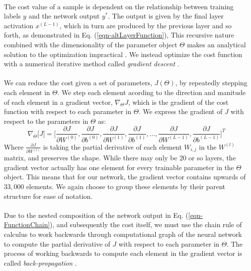 \documentclass[12pt,letterpaper]{article}
\begin{document}
\paragraph*{}The cost value of a sample is dependent on the relationship between training labels $y$ and the network output $y^*$. The output is given by the final layer activation $x^{(L-1)}$, which in turn are produced by the previous layer and so forth, as demonstrated in Eq. (\ref{eqn-altLayerFunction}), This recursive nature combined with the dimensionality of the parameter object $\Theta$ makes an analytical solution to the optimization impractical \cite{Geron,Goodfellow,James}. We instead optimize the cost function with a numerical iterative method called \textit{gradient descent} \cite{Loy}. 

\paragraph*{}We can reduce the cost given a set of parameters, $J(\Theta)$, by repeatedly stepping each element in $\Theta$. We step each element acording to the direction and manitude of each element in a gradient vector, $\nabla_\Theta J$, which is the gradient of the cost function with respect to each parameter in $\Theta$. We express the gradient of $J$ with respect to the parameters in $\Theta$ as:
\begin{equation}
\label{eqn-CostGradient}
\nabla_{\Theta}\big[ J \big] = 
\Big[ 	\frac{\partial J}{\partial W^{(0)}}, \frac{\partial J}{\partial b^{(0)}}, 
		\frac{\partial J}{\partial W^{(1)}}, \frac{\partial J}{\partial b^{(1)}}, \hdots ,
		\frac{\partial J}{\partial W^{(L-1)}}, \frac{\partial J}{\partial b^{(L-1)}} \Big]^T
\end{equation}
Where $\frac{\partial J}{\partial W^{(l)}}$ is taking the partial derivative of each element $W_{i,j}$ in the $W^{(l)}$ matrix, and preserves the shape. While there may only be $20$ or so layers, the gradient vector actually has one element for every trainable parameter in the $\Theta$ object. This means that for our network, the gradient vector contains upwards of $33,000$ elements. We again choose to group these elements by their parent structure for ease of notation.

\paragraph*{}Due to the nested composition of the network output in Eq. (\ref{eqn-FunctionChain}), and subsequently the cost itself, we must use the chain rule of calculus to work backwards through computational graph of the neural network to compute the partial derivative of $J$ with respect to each parameter in $\Theta$. The process of working backwards to compute each element in the gradient vector is called \textit{back-propagation} \cite{Geron,Goodfellow,Loy}. 
\end{document}
